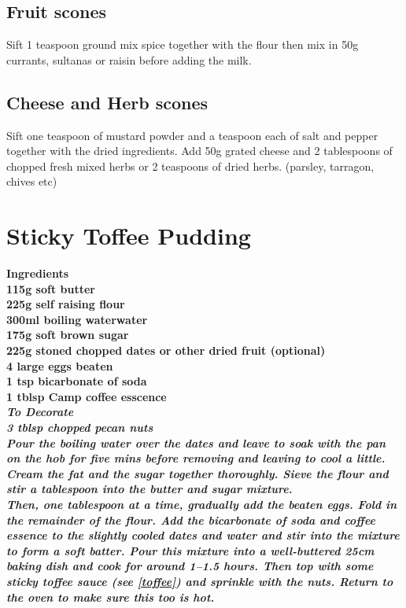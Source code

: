 \documentclass[18pt, oneside]{book}
\begin{document}
\subsection{Fruit scones}
Sift 1 teaspoon ground mix spice together with the flour then mix in 50g currants, sultanas or raisin before adding the milk.

\subsection{Cheese and Herb scones}
Sift one teaspoon of mustard powder and a  teaspoon each of salt and pepper together with the dried ingredients. Add 50g grated cheese and 2 tablespoons of chopped fresh mixed herbs or 2 teaspoons of dried herbs. (parsley, tarragon, chives etc)
 
\section{Sticky Toffee Pudding}
\bf{Ingredients} \normalfont \\
115g soft butter \\
225g self raising flour \\
300ml boiling waterwater \\ 
175g soft brown sugar \\
225g stoned chopped dates or other dried fruit (optional) \\
4 large eggs beaten \\
1 tsp bicarbonate of soda \\
1 tblsp Camp coffee esscence \\


\it{To Decorate} \normalfont \\
3 tblsp chopped pecan nuts \\

Pour the boiling water over the dates and leave to soak with the pan on the hob for five mins before removing and leaving to cool a little. Cream the fat and the sugar together thoroughly. Sieve the flour and stir a tablespoon into the butter and sugar mixture. \\

Then, one tablespoon at a time, gradually add the beaten eggs. Fold in the remainder of the flour. Add the bicarbonate of soda and coffee essence to the slightly cooled dates and water and stir into the mixture to form a soft batter. Pour this mixture into a well-buttered 25cm baking dish and cook for around 1--1.5 hours. Then top with some sticky toffee sauce (see \ref{toffee}) and sprinkle with the nuts. Return to the oven to make sure this too is hot. 
\end{document}
